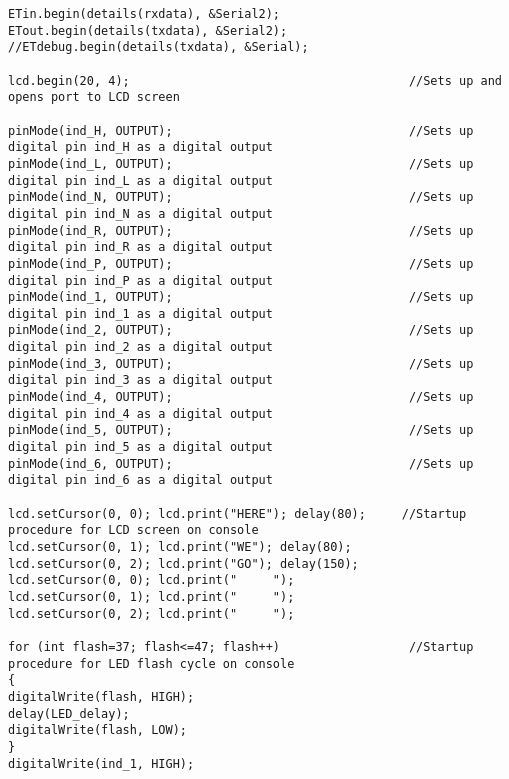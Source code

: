 \begin{lstlisting}[breaklines=true,basicstyle=\tiny]
ETin.begin(details(rxdata), &Serial2);
ETout.begin(details(txdata), &Serial2);
//ETdebug.begin(details(txdata), &Serial);

lcd.begin(20, 4);                                       //Sets up and opens port to LCD screen

pinMode(ind_H, OUTPUT);                                 //Sets up digital pin ind_H as a digital output
pinMode(ind_L, OUTPUT);                                 //Sets up digital pin ind_L as a digital output
pinMode(ind_N, OUTPUT);                                 //Sets up digital pin ind_N as a digital output
pinMode(ind_R, OUTPUT);                                 //Sets up digital pin ind_R as a digital output
pinMode(ind_P, OUTPUT);                                 //Sets up digital pin ind_P as a digital output
pinMode(ind_1, OUTPUT);                                 //Sets up digital pin ind_1 as a digital output
pinMode(ind_2, OUTPUT);                                 //Sets up digital pin ind_2 as a digital output
pinMode(ind_3, OUTPUT);                                 //Sets up digital pin ind_3 as a digital output
pinMode(ind_4, OUTPUT);                                 //Sets up digital pin ind_4 as a digital output
pinMode(ind_5, OUTPUT);                                 //Sets up digital pin ind_5 as a digital output
pinMode(ind_6, OUTPUT);                                 //Sets up digital pin ind_6 as a digital output

lcd.setCursor(0, 0); lcd.print("HERE"); delay(80);     //Startup procedure for LCD screen on console 
lcd.setCursor(0, 1); lcd.print("WE"); delay(80);
lcd.setCursor(0, 2); lcd.print("GO"); delay(150);
lcd.setCursor(0, 0); lcd.print("     ");
lcd.setCursor(0, 1); lcd.print("     ");
lcd.setCursor(0, 2); lcd.print("     ");

for (int flash=37; flash<=47; flash++)                  //Startup procedure for LED flash cycle on console
{
digitalWrite(flash, HIGH);
delay(LED_delay);
digitalWrite(flash, LOW);
}
digitalWrite(ind_1, HIGH);


\end{lstlisting}
